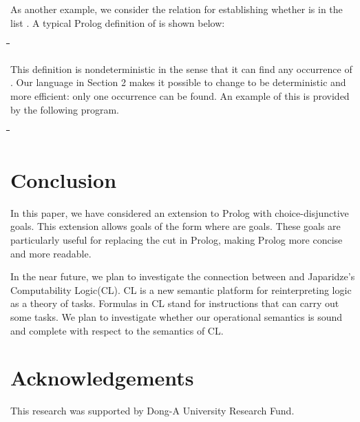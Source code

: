 \documentclass[letter]{ieice}
\newenvironment{exmple}{
 \begingroup \begin{tabbing} \hspace{2em}\= \hspace{3em}\= \hspace{3em}\=
\hspace{3em}\= \hspace{3em}\= \hspace{3em}\= \kill}{
 \end{tabbing}\endgroup}
\begin{document}
As another example, we consider  the relation  for establishing whether  is in the list .
A typical Prolog  definition of  is shown below:

\begin{exmple}
  \> \hspace{9em} \\
\end{exmple}
\noindent This definition is nondeterministic in the sense that it can find any occurrence of .
Our language in Section 2 makes it possible to change  to be deterministic and more efficient: 
only one occurrence can be
found. An example of  this is provided by the following
 program.

\begin{exmple}
  \> \hspace{9em} \\
\end{exmple}



\section{Conclusion}\label{sec:conc}

In this paper, we have considered an extension to Prolog with  
choice-disjunctive  goals. This extension allows goals of 
the form    where  are goals.
These goals are 
 particularly useful for replacing the cut in Prolog, making Prolog
more concise and more readable.

In the near future, we plan 
to  investigate the connection between 
\muprolog and Japaridze's Computability Logic(CL)\cite{Jap03,Jap08}.
CL is a new semantic platform for reinterpreting logic
as a theory of tasks. Formulas in CL stand for instructions
that can carry out some  tasks. We plan to investigate whether  our operational semantics is sound and complete
with respect to  the semantics of CL. 

\section{Acknowledgements}

This research was supported by Dong-A University Research Fund.
\end{document}
